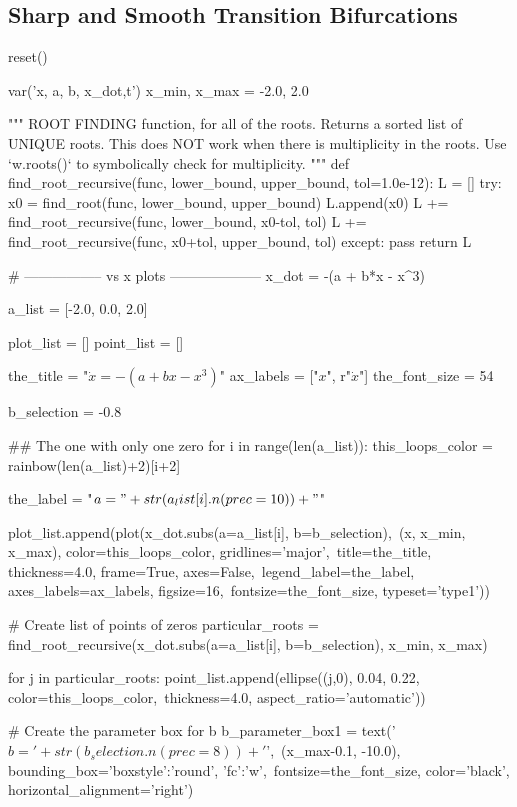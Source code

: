 \subsection{Sharp and Smooth Transition Bifurcations}
\begin{sagesilent}
	reset()

	var('x, a, b, x_dot,t')
	x_min, x_max = -2.0, 2.0

	"""
		ROOT FINDING function, for all of the roots.
		Returns a sorted list of UNIQUE roots. This does NOT work when there
		is multiplicity in the roots. Use `w.roots()` to symbolically check
		for multiplicity.
	"""
	def find_root_recursive(func, lower_bound, upper_bound, tol=1.0e-12):
	    L = []
	    try:
	    	x0 = find_root(func, lower_bound, upper_bound)
	    	L.append(x0)
	    	L += find_root_recursive(func, lower_bound, x0-tol, tol)
	    	L += find_root_recursive(func, x0+tol, upper_bound, tol)
	    except:
	    	pass
	    return L

	# -----------------  vs x plots --------------------
	x_dot = -(a + b*x - x^3)

	a_list = [-2.0, 0.0, 2.0]

	plot_list = []
	point_list = []

	the_title = "$\dot{x} = -(a + bx - x^3)$"
	ax_labels = ["$x$", r"$\dot{x}$"]
	the_font_size = 54

	b_selection = -0.8

	## The one with only one zero
	for i in range(len(a_list)):
	    this_loops_color = rainbow(len(a_list)+2)[i+2]

	    the_label = "$a = " + str(a_list[i].n(prec=10)) + "$"

	    plot_list.append(plot(x_dot.subs(a=a_list[i], b=b_selection),\
	    		(x, x_min, x_max), color=this_loops_color, gridlines='major',\
	    		title=the_title, thickness=4.0, frame=True, axes=False,\
	    		legend_label=the_label, axes_labels=ax_labels, figsize=16,\
	    		fontsize=the_font_size, typeset='type1'))

	    # Create list of points of zeros
	    particular_roots = find_root_recursive(x_dot.subs(a=a_list[i], b=b_selection), x_min, x_max)

	    for j in particular_roots:
	    	point_list.append(ellipse((j,0), 0.04, 0.22, color=this_loops_color,\
	    			thickness=4.0, aspect_ratio='automatic'))

	# Create the parameter box for b
	b_parameter_box1 = text('$b = ' + str(b_selection.n(prec=8)) + '$',\
			(x_max-0.1, -10.0), bounding_box={'boxstyle':'round', 'fc':'w'},\
			fontsize=the_font_size, color='black', horizontal_alignment='right')


\end{sagesilent}
